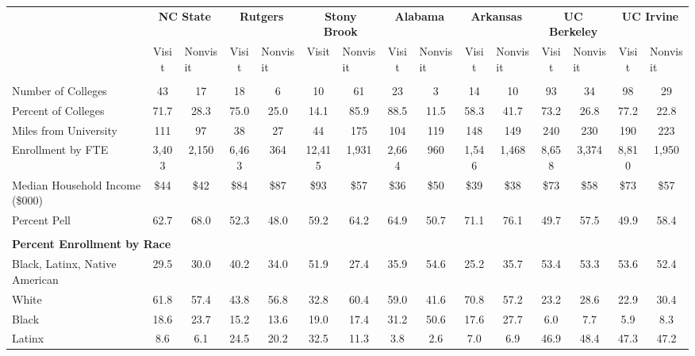 \begin{tabular*}{\linewidth}{@{\extracolsep{\fill} } lcccccccccccccc}%
&\multicolumn{2}{c}{\bfseries NC State}&\multicolumn{2}{c}{\bfseries Rutgers}&\multicolumn{2}{c}{\bfseries Stony Brook}&\multicolumn{2}{c}{\bfseries Alabama}&\multicolumn{2}{c}{\bfseries Arkansas}&\multicolumn{2}{c}{\bfseries UC Berkeley}&\multicolumn{2}{c}{\bfseries UC Irvine}\\%
&Visit&\multicolumn{1}{l}{Nonvisit}&Visit&\multicolumn{1}{l}{Nonvisit}&Visit&\multicolumn{1}{l}{Nonvisit}&Visit&\multicolumn{1}{l}{Nonvisit}&Visit&\multicolumn{1}{l}{Nonvisit}&Visit&\multicolumn{1}{l}{Nonvisit}&Visit&\multicolumn{1}{l}{Nonvisit}\\%
\hline%
&&&&&&&&&&&&&&\\%
\hspace{0cm}Number of Colleges&43&17&18&6&10&61&23&3&14&10&93&34&98&29\\%
Percent of Colleges&71.7&28.3&75.0&25.0&14.1&85.9&88.5&11.5&58.3&41.7&73.2&26.8&77.2&22.8\\%
\hspace{0cm}Miles from University&111&97&38&27&44&175&104&119&148&149&240&230&190&223\\%
\hspace{0cm}Enrollment by FTE&3,403&2,150&6,463&364&12,415&1,931&2,664&960&1,546&1,468&8,658&3,374&8,810&1,950\\%
\hspace{0cm}Median Household Income (\$000)&\$44&\$42&\$84&\$87&\$93&\$57&\$36&\$50&\$39&\$38&\$73&\$58&\$73&\$57\\%
\hspace{0cm}Percent Pell&62.7&68.0&52.3&48.0&59.2&64.2&64.9&50.7&71.1&76.1&49.7&57.5&49.9&58.4\\%
&&&&&&&&&&&&&&\\%
\multicolumn{15}{l}{\bfseries Percent Enrollment by Race}\\%
\hspace{0.2cm}Black, Latinx, Native American&29.5&30.0&40.2&34.0&51.9&27.4&35.9&54.6&25.2&35.7&53.4&53.3&53.6&52.4\\%
\hspace{0.2cm}White&61.8&57.4&43.8&56.8&32.8&60.4&59.0&41.6&70.8&57.2&23.2&28.6&22.9&30.4\\%
\hspace{0.2cm}Black&18.6&23.7&15.2&13.6&19.0&17.4&31.2&50.6&17.6&27.7&6.0&7.7&5.9&8.3\\%
\hspace{0.2cm}Latinx&8.6&6.1&24.5&20.2&32.5&11.3&3.8&2.6&7.0&6.9&46.9&48.4&47.3&47.2\\%

\end{tabular*}
